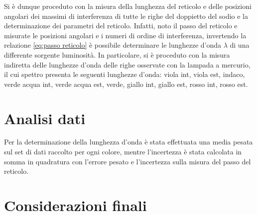 \documentclass{article}
\begin{document}
        Si è dunque proceduto con la misura della lunghezza del reticolo e delle posizioni angolari dei massimi di interferenza di tutte 
        le righe del doppietto del sodio e la determinazione dei parametri del reticolo. 
        Infatti, noto il passo del reticolo e misurate le posizioni angolari e i numeri di ordine di interferenza, invertendo la relazione \ref{eq:passo reticolo} è 
        possibile determinare le lunghezze d'onda $ \lambda $ di una differente sorgente luminosità. 
        In particolare, si è proceduto con la misura indiretta delle lunghezze d'onda delle righe osservate con la lampada a mercurio, il cui spettro presenta
        le seguenti lunghezze d'onda: viola int, viola est, indaco, verde acqua int, verde acqua est, verde, giallo int, giallo est, rosso int, rosso est. \\


    \section{Analisi dati}

        Per la determinazione della lunghezza d'onda è stata effettuata una media pesata sul set di dati raccolto per ogni colore, 
        mentre l'incertezza è stata calcolata in somma in quadratura con l'errore pesato e l'incertezza sulla misura del passo del reticolo. \\


    \section{Considerazioni finali}
\end{document}
